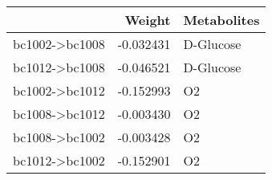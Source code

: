 \begin{tabular}{lrl}
\toprule
{} &    Weight & Metabolites \\
\midrule
bc1002->bc1008 & -0.032431 &   D-Glucose \\
bc1012->bc1008 & -0.046521 &   D-Glucose \\
bc1002->bc1012 & -0.152993 &          O2 \\
bc1008->bc1012 & -0.003430 &          O2 \\
bc1008->bc1002 & -0.003428 &          O2 \\
bc1012->bc1002 & -0.152901 &          O2 \\
\bottomrule
\end{tabular}
